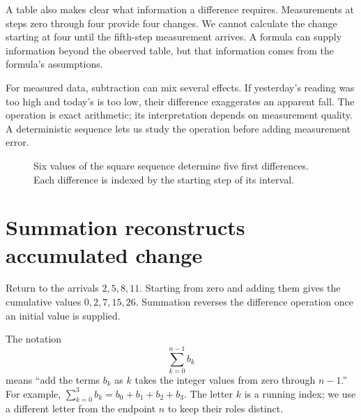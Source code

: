 \documentclass[11pt,oneside,openany]{book}
\theoremstyle{definition}
\theoremstyle{remark}
\numberwithin{equation}{chapter}
\begin{document}
A table also makes clear what information a difference requires. Measurements at steps zero through four provide four changes. We cannot calculate the change starting at four until the fifth-step measurement arrives. A formula can supply information beyond the observed table, but that information comes from the formula's assumptions.

For measured data, subtraction can mix several effects. If yesterday's reading was too high and today's is too low, their difference exaggerates an apparent fall. The operation is exact arithmetic; its interpretation depends on measurement quality. A deterministic sequence lets us study the operation before adding measurement error.

\begin{figure}[htbp]\centering
{}
\caption{Six values of the square sequence determine five first differences. Each difference is indexed by the starting step of its interval.}\end{figure}

\section{Summation reconstructs accumulated change}\label{ch01-summation-reconstructs-accumulated-change}

Return to the arrivals \(2,5,8,11\). Starting from zero and adding them gives the cumulative values \(0,2,7,15,26\). Summation reverses the difference operation once an initial value is supplied.

The notation \[\sum_{k=0}^{n-1}b_k\] means ``add the terms \(b_k\) as \(k\) takes the integer values from zero through \(n-1\).'' For example, \(\sum_{k=0}^3 b_k=b_0+b_1+b_2+b_3\). The letter \(k\) is a running index; we use a different letter from the endpoint \(n\) to keep their roles distinct.
\end{document}
